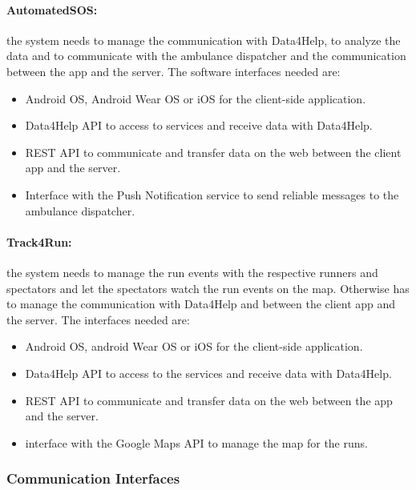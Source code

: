 \documentclass[a4paper]{article}
\begin{document}
    \paragraph{AutomatedSOS:} the system needs to manage the communication with Data4Help, to analyze the data and to communicate with the ambulance dispatcher and the communication between the app and the server. The software interfaces needed are:
    
    \begin{itemize}
        \item Android OS, Android Wear OS or iOS for the client-side application.
        \item Data4Help API to access to services and receive data with Data4Help.
        \item REST API to communicate and transfer data on the web between the client app and the server.
        \item Interface with the Push Notification service to send reliable messages to the ambulance dispatcher.
    \end{itemize}
    
    \paragraph{Track4Run:} the system needs to manage the run events with the respective runners and spectators and let the spectators watch the run events on the map. Otherwise has to manage the communication with Data4Help and between the client app and the server. The interfaces needed are:
    
    \begin{itemize}
        \item Android OS, android Wear OS or iOS for the client-side application.
        \item Data4Help API to access to the services and receive data with Data4Help.
        \item REST API to communicate and transfer data on the web between the app and the server.
        \item interface with the Google Maps API to manage the map for the runs.
    \end{itemize}
    
    
    \subsubsection{Communication Interfaces}
    
\end{document}
